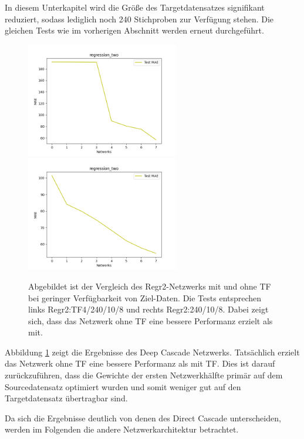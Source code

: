 In diesem Unterkapitel wird die Größe des Targetdatensatzes signifikant reduziert, sodass lediglich noch 240 Stichproben zur Verfügung stehen. 
Die gleichen Tests wie im vorherigen Abschnitt werden erneut durchgeführt.

\begin{figure}[htpb]
    \includegraphics[height=5cm]{../../Plots/ba_plots/regression_small/regr2_ts.png}
    \includegraphics[height=5cm]{../../Plots/ba_plots/regression_small/woregr2_ts.png}
    \caption{\label{fig:smallregr} 
    \small{Abgebildet ist der Vergleich des Regr2-Netzwerks mit und ohne TF bei geringer Verfügbarkeit von Ziel-Daten. Die Tests entsprechen 
    links Regr2:TF4/240/10/8 und rechts Regr2:240/10/8. Dabei zeigt sich, dass das Netzwerk ohne TF eine bessere Performanz 
    erzielt als mit.}}
\end{figure}

Abbildung \ref{fig:smallregr} zeigt die Ergebnisse des Deep Cascade Netzwerks. Tatsächlich erzielt das Netzwerk ohne TF eine 
bessere Performanz als mit TF. Dies ist darauf zurückzuführen, dass die Gewichte der ersten Netzwerkhälfte primär auf dem 
Sourcedatensatz optimiert wurden und somit weniger gut auf den Targetdatensatz übertragbar sind.

Da sich die Ergebnisse deutlich von denen des Direct Cascade unterscheiden, werden im Folgenden die andere Netzwerkarchitektur betrachtet.

